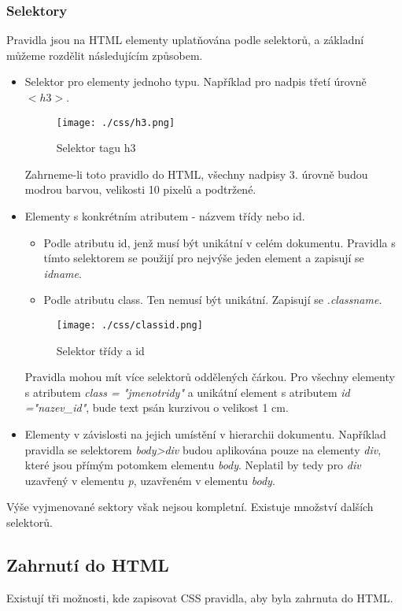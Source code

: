 \documentclass[main.tex]{subfiles}
\begin{document}
	\subsubsection{Selektory}
Pravidla jsou na HTML elementy uplatňována podle selektorů, a základní můžeme rozdělit následujícím způsobem.
\begin{itemize}
	\item Selektor pro elementy jednoho typu. Například pro nadpis třetí úrovně  $<h3>$.
		\begin{figure}[h]
			\centering
			\texttt{[image: ./css/h3.png]}
			\caption{Selektor tagu h3}
		\end{figure}
		Zahrneme-li toto pravidlo do HTML, všechny nadpisy 3. úrovně budou modrou barvou, velikosti 10 pixelů a podtržené.
	\item Elementy s konkrétním atributem - názvem třídy nebo id.
		\begin{itemize}
			\item Podle atributu id, jenž musí být unikátní v celém dokumentu. Pravidla s tímto selektorem se použijí pro nejvýše jeden element a zapisují se \textit{idname}. %
			\item Podle atributu class. Ten nemusí být unikátní. Zapisují se \textit{.classname}.
		\end{itemize}


		\begin{figure}[h]
			\centering
			\texttt{[image: ./css/classid.png]}
			\caption{Selektor třídy a id}
		\end{figure}
		Pravidla mohou mít více selektorů oddělených čárkou. Pro všechny elementy s atributem \textit{class = "jmenotridy"} a unikátní element s atributem \textit{id ="nazev\_id"}, bude text psán kurzivou o velikost 1 cm.
	\item Elementy v závislosti na jejich umístění v hierarchii dokumentu. Například pravidla se selektorem \textit{body>div} budou aplikována pouze na elementy \textit{div}, které jsou přímým potomkem elementu \textit{body}. Neplatil by tedy pro \textit{div} uzavřený v elementu \textit{p}, uzavřeném v elementu \textit{body}.
\end{itemize}
Výše vyjmenované sektory však nejsou kompletní. Existuje množství dalších selektorů. \cite{web:cz:selektory}

\subsection{Zahrnutí do HTML}
Existují tři možnosti, kde zapisovat CSS pravidla, aby byla zahrnuta do HTML.
\end{document}
